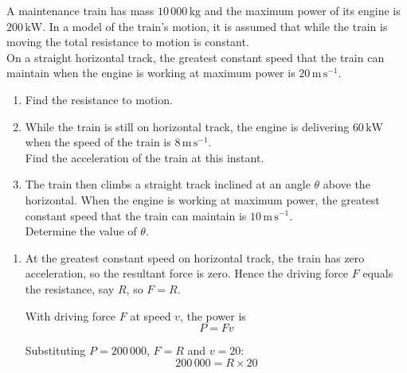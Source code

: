 \documentclass[leqno]{article}
\begin{document}
\djsFrontMatter
\begin{enumerate}[
  label=\textbf{\arabic*.},
  leftmargin=*,
  topsep=0pt,
  partopsep=0pt,
  parsep=0pt
]

\questionitem

A maintenance train has mass $10\,000\,\mathrm{kg}$ and the maximum power of its engine is $200\,\mathrm{kW}$. In a model of the train's motion, it is assumed that while the train is moving the total resistance to motion is constant. \\

On a straight horizontal track, the greatest constant speed that the train can maintain when the engine is working at maximum power is $20\,\mathrm{m\,s^{-1}}$. \\

\begin{enumerate}[label=\textbf{(\alph*)}]
  \item Find the resistance to motion.  \\
  \item While the train is still on horizontal track, the engine is delivering $60\,\mathrm{kW}$ when the speed of the train is $8\,\mathrm{m\,s^{-1}}$. \\
  Find the acceleration of the train at this instant.  \\
  \item The train then climbs a straight track inclined at an angle $\theta$ above the horizontal. When the engine is working at maximum power, the greatest constant speed that the train can maintain is $10\,\mathrm{m\,s^{-1}}$. \\
  Determine the value of $\theta$.  \\
\end{enumerate}

\vspace*{10pt}

\begin{djsSolution}
\begin{enumerate}[label=\textbf{(\alph*)}, start=1]
  \item At the greatest constant speed on horizontal track, the train has zero acceleration, so the resultant force is zero. Hence the driving force $F$ equals the resistance, say $R$, so $F=R$.

With driving force $F$ at speed $v$, the power is
\[
P=Fv
\]

Substituting $P=200\,000$, $F=R$ and $v=20$:
\[
200\,000 = R \times 20
\]


\end{enumerate}
\end{djsSolution}
\end{enumerate}
\end{document}
